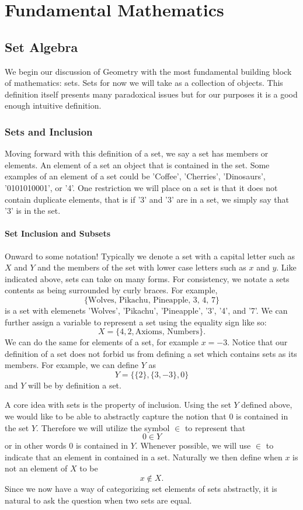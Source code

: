 \documentclass[12pt]{book}
\begin{document}
\vfill
\pagebreak

\chapter{Fundamental Mathematics}
\section{Set Algebra}
	We begin our discussion of Geometry with the most fundamental building block of mathematics: sets. Sets for now we will take as a collection of objects. This definition itself presents many paradoxical issues but for our purposes it is a good enough intuitive definition. 

\subsection*{Sets and Inclusion}
	Moving forward with this definition of a set, we say a set has members or elements. An element of a set an object that is contained in the set. Some examples of an element of a set could be 'Coffee', 'Cherries', 'Dinosaurs', '0101010001', or '4'. One restriction we will place on a set is that it does not contain duplicate elements, that is if '3' and '3' are in a set, we simply say that '3' is in the set. 

\subsubsection{Set Inclusion and Subsets}
	Onward to some notation! Typically we denote a set with a capital letter such as $X$ and $Y$ and the members of the set with lower case letters such as $x$ and $y$. Like indicated above, sets can take on many forms. For consistency, we notate a sets contents as being surrounded by curly braces. For example,
\[\{\text{Wolves, Pikachu, Pineapple, 3, 4, 7}\}\]
is a set with elemenets 'Wolves', 'Pikachu', 'Pineapple', '3', '4', and '7'. We can further assign a variable to represent a set using the equality sign like so:
\[X=\{4,2,\text{Axioms, Numbers}\}.\]
We can do the same for elements of a set, for example $x=-3$. Notice that our definition of a set does not forbid us from defining a set which contains sets as its members. For example, we can define $Y$ as 
\[Y=\{\{2\},\{3,-3\},0\}\]
and $Y$ will be by definition a set.

	A core idea with sets is the property of inclusion. Using the set $Y$ defined above, we would like to be able to abstractly capture the notion that $0$ is contained in the set $Y$. Therefore we will utilize the symbol $\in$ to represent that 
\[0\in Y\] 
or in other words 0 is contained in $Y$. Whenever possible, we will use $\in$ to indicate that an element in contained in a set. Naturally we then define when $x$ is not an element of $X$ to be
\[x\notin X.\]
Since we now have a way of categorizing set elements of sets abstractly, it is natural to ask the question when two sets are equal.\\
\end{document}
